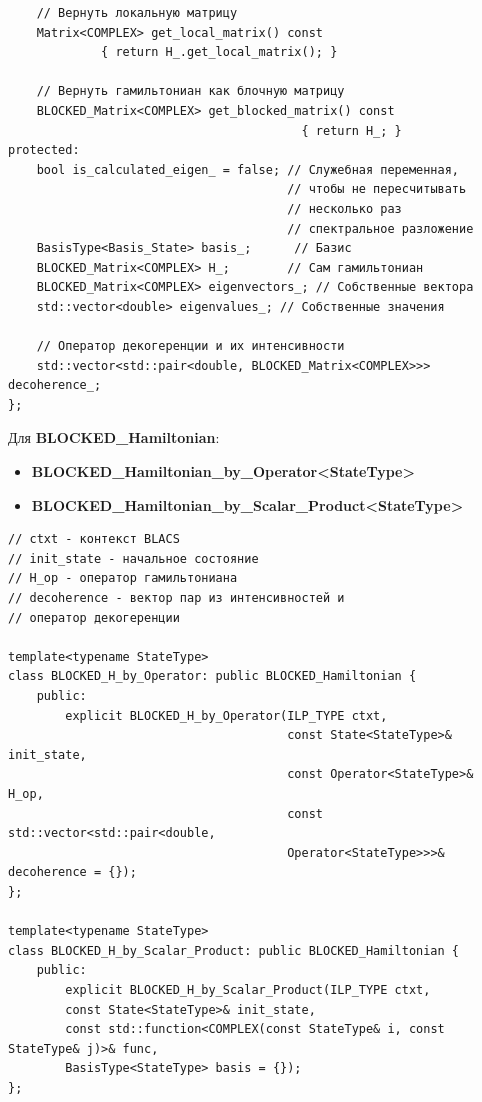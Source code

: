 \documentclass[12pt,fleqn]{article}
\begin{document}
\begin{mdframed}[linecolor=black, topline=true, bottomline=true,
    leftline=false, rightline=false]
\begin{verbatim}
    // Вернуть локальную матрицу
    Matrix<COMPLEX> get_local_matrix() const
             { return H_.get_local_matrix(); }

    // Вернуть гамильтониан как блочную матрицу
    BLOCKED_Matrix<COMPLEX> get_blocked_matrix() const
                                         { return H_; }
protected:
    bool is_calculated_eigen_ = false; // Служебная переменная,
                                       // чтобы не пересчитывать
                                       // несколько раз
                                       // спектральное разложение
    BasisType<Basis_State> basis_;      // Базис
    BLOCKED_Matrix<COMPLEX> H_;        // Сам гамильтониан
    BLOCKED_Matrix<COMPLEX> eigenvectors_; // Собственные вектора
    std::vector<double> eigenvalues_; // Собственные значения

    // Оператор декогеренции и их интенсивности
    std::vector<std::pair<double, BLOCKED_Matrix<COMPLEX>>> decoherence_;
};

\end{verbatim}
\end{mdframed}

Для \textbf{BLOCKED\_Hamiltonian}:
\begin{itemize}
    \item{\textbf{BLOCKED\_Hamiltonian\_by\_Operator<StateType>}}
    \item{\textbf{BLOCKED\_Hamiltonian\_by\_Scalar\_Product<StateType>}}
\end{itemize}

\begin{mdframed}[linecolor=black, topline=true, bottomline=true,
    leftline=false, rightline=false]
\begin{verbatim}
// ctxt - контекст BLACS
// init_state - начальное состояние
// H_op - оператор гамильтониана
// decoherence - вектор пар из интенсивностей и
// оператор декогеренции

template<typename StateType>
class BLOCKED_H_by_Operator: public BLOCKED_Hamiltonian {
    public:
        explicit BLOCKED_H_by_Operator(ILP_TYPE ctxt,
                                       const State<StateType>& init_state,
                                       const Operator<StateType>& H_op,
                                       const std::vector<std::pair<double,
                                       Operator<StateType>>>& decoherence = {});
};

template<typename StateType>
class BLOCKED_H_by_Scalar_Product: public BLOCKED_Hamiltonian {
    public:
        explicit BLOCKED_H_by_Scalar_Product(ILP_TYPE ctxt,
        const State<StateType>& init_state, 
        const std::function<COMPLEX(const StateType& i, const StateType& j)>& func,
        BasisType<StateType> basis = {});
};
\end{verbatim}
\end{mdframed}
\end{document}
